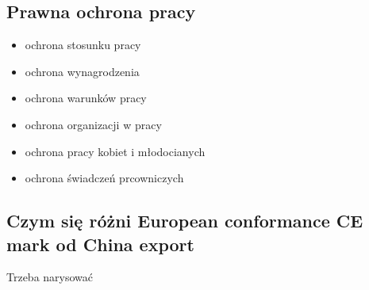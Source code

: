 \documentclass[11pt]{article}
\begin{document}
\subsection{Prawna ochrona pracy}
\label{sec:org808cb9c}
\begin{itemize}
\item ochrona stosunku pracy
\item ochrona wynagrodzenia
\item ochrona warunków pracy
\item ochrona organizacji w pracy
\item ochrona pracy kobiet i młodocianych
\item ochrona świadczeń prcowniczych
\end{itemize}
\subsection{Czym się różni European conformance CE mark od China export}
\label{sec:org372d80f}
Trzeba narysować
\end{document}
